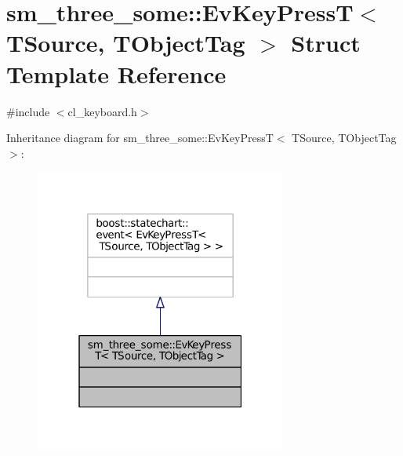 \hypertarget{structsm__three__some_1_1EvKeyPressT}{}\section{sm\+\_\+three\+\_\+some\+:\+:Ev\+Key\+PressT$<$ T\+Source, T\+Object\+Tag $>$ Struct Template Reference}
\label{structsm__three__some_1_1EvKeyPressT}


{\ttfamily \#include $<$cl\+\_\+keyboard.\+h$>$}



Inheritance diagram for sm\+\_\+three\+\_\+some\+:\+:Ev\+Key\+PressT$<$ T\+Source, T\+Object\+Tag $>$\+:
\nopagebreak
\begin{figure}[H]
\begin{center}
\leavevmode
\includegraphics[width=235pt]{structsm__three__some_1_1EvKeyPressT__inherit__graph}
\end{center}
\end{figure}


